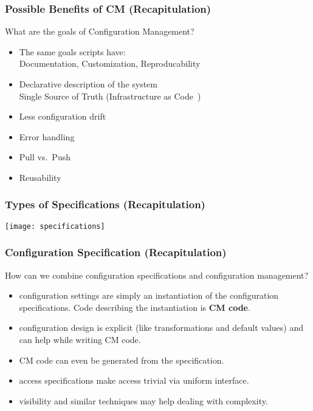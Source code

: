 \begin{frame}
	\frametitle{Possible Benefits of CM (Recapitulation)}

	\begin{task}
	What are the goals of Configuration Management?
	\end{task}

	\pause

	\begin{itemize} %
	\item The same goals scripts have: \\
		Documentation, Customization, Reproducability
	\item Declarative description of the system \\
		Single Source of Truth 
		(Infrastructure as Code~\cite{waldemar2013testing})
	\item Less configuration drift
	\item Error handling
	\item Pull vs.\ Push
	\item Reusability
	\end{itemize}
\end{frame}

\begin{frame}
	\frametitle{Types of Specifications (Recapitulation)}

	\texttt{[image: specifications]}
\end{frame}


\begin{frame}
	\frametitle{Configuration Specification (Recapitulation)}

	\begin{task}
	How can we combine configuration specifications and configuration management?
	\end{task}

	\pause

	\begin{itemize} %
	\item configuration settings are simply an instantiation of the configuration specifications.
		Code describing the instantiation is \textbf{CM code}.
	\item configuration design is explicit (like transformations and default values) and can help while writing CM code.
	\item CM code can even be generated from the specification.
	\item access specifications make access trivial via uniform interface.
	\item visibility and similar techniques may help dealing with complexity.
	\end{itemize}
\end{frame}

